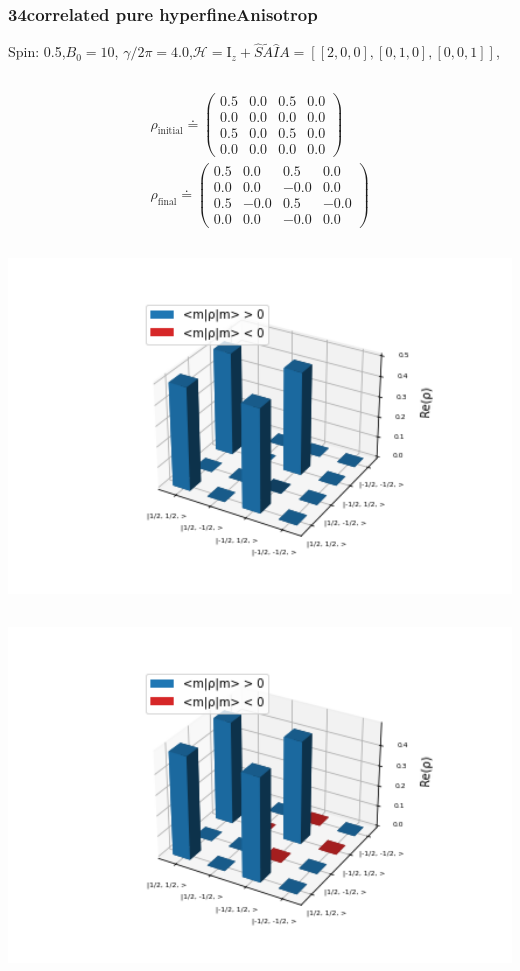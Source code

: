 \documentclass[10pt]{beamer}
\begin{document}
\begin{frame}
\frametitle{34correlated pure hyperfineAnisotrop}
Spin: 0.5,$B_0= 10$, $\gamma/2\pi = 4.0$,$\mathcal{H}=\text{I}_{z}+ \hat{S}\tilde{A}\hat{I}$$A=[[2, 0, 0], [0, 1, 0], [0, 0, 1]]$,
\begin{columns}[T]
\begin{column}{.5\textwidth}
\begin{align*}
\rho_{\text{initial}}\doteq
\begin{pmatrix}
0.5 & 0.0 & 0.5 & 0.0 \\
0.0 & 0.0 & 0.0 & 0.0 \\
0.5 & 0.0 & 0.5 & 0.0 \\
0.0 & 0.0 & 0.0 & 0.0
\end{pmatrix}
\\
\rho_{\text{final}}\doteq
\begin{pmatrix}
0.5 & 0.0 & 0.5 & 0.0 \\
0.0 & 0.0 & -0.0 & 0.0 \\
0.5 & -0.0 & 0.5 & -0.0 \\
0.0 & 0.0 & -0.0 & 0.0
\end{pmatrix}
\end{align*}
\begin{column}{.5\textwidth}
\includegraphics[width=1.5\textwidth]{./spin1-2/34correlated_pure_hyperfineAnisotrop/InitialRealPartDensityMatrix.png}
\end{column}
\begin{column}{.5\textwidth}
\includegraphics[width=1.5\textwidth]{./spin1-2/34correlated_pure_hyperfineAnisotrop/EvolvedRealPartDensityMatrix.png}

\end{column}
\end{column}
\end{columns}$$
\end{frame}
\end{document}
